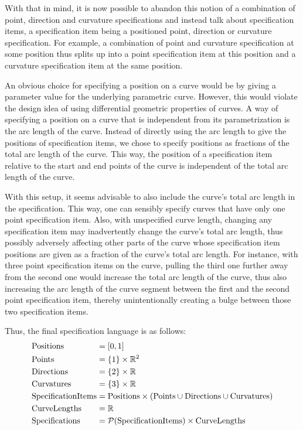 \documentclass[a4paper]{article}
\begin{document}
				With that in mind, it is now possible to abandon this notion of a combination of point, direction and curvature specifications and instead talk about specification items, a specification item being a positioned point, direction or curvature specification. For example, a combination of point and curvature specification at some position thus splits up into a point specification item at this position and a curvature specification item at the same position.

				An obvious choice for specifying a position on a curve would be by giving a parameter value for the underlying parametric curve. However, this would violate the design idea of using differential geometric properties of curves. A way of specifying a position on a curve that is independent from its parametrization is the arc length of the curve. Instead of directly using the arc length to give the positions of specification items, we chose to specify positions as fractions of the total arc length of the curve. This way, the position of a specification item relative to the start and end points of the curve is independent of the total arc length of the curve.

				With this setup, it seems advisable to also include the curve's total arc length in the specification. This way, one can sensibly specify curves that have only one point specification item. Also, with unspecified curve length, changing any specification item may inadvertently change the curve's total arc length, thus possibly adversely affecting other parts of the curve whose specification item positions are given as a fraction of the curve's total arc length. For instance, with three point specification items on the curve, pulling the third one further away from the second one would increase the total arc length of the curve, thus also increasing the arc length of the curve segment between the first and the second point specification item, thereby unintentionally creating a bulge between those two specification items.

				Thus, the final specification language is as follows:
				\begin{equation*}
					\begin{alignedat}{2}
						& \mathrm{Positions}          && = \left[ 0,1 \right]\\
						& \mathrm{Points}             && = \left\{ 1 \right\} \times \mathbb{R}^{2}\\
						& \mathrm{Directions}         && = \left\{ 2 \right\} \times \mathbb{R}\\
						& \mathrm{Curvatures}         && = \left\{ 3 \right\} \times \mathbb{R}\\
						& \mathrm{SpecificationItems} && = \mathrm{Positions} \times \left(\mathrm{Points} \cup \mathrm{Directions} \cup \mathrm{Curvatures}\right)\\
						& \mathrm{CurveLengths}       && = \mathbb{R}\\
						& \mathrm{Specifications}     && = \mathcal{P}\!\left( \mathrm{SpecificationItems} \right) \times \mathrm{CurveLengths}
					\end{alignedat}
				\end{equation*}
\end{document}
